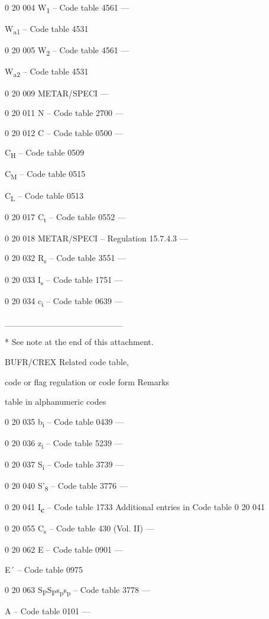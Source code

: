 0 20 004 W\textsubscript{1} -- Code table 4561 ---

W\textsubscript{a1} -- Code table 4531

0 20 005 W\textsubscript{2} -- Code table 4561 ---

W\textsubscript{a2} -- Code table 4531

0 20 009 METAR/SPECI ---

0 20 011 N -- Code table 2700 ---

0 20 012 C -- Code table 0500 ---

C\textsubscript{H} -- Code table 0509

C\textsubscript{M} -- Code table 0515

C\textsubscript{L} -- Code table 0513

0 20 017 C\textsubscript{t} -- Code table 0552 ---

0 20 018 METAR/SPECI -- Regulation 15.7.4.3 ---

0 20 032 R\textsubscript{s} -- Code table 3551 ---

0 20 033 I\textsubscript{s} -- Code table 1751 ---

0 20 034 c\textsubscript{i} -- Code table 0639 ---

\_\_\_\_\_\_\_\_\_\_\_\_\_\_\_\_\_\_\_

* See note at the end of this attachment.

BUFR/CREX Related code table,

code or flag regulation or code form Remarks

table in alphanumeric codes

0 20 035 b\textsubscript{i} -- Code table 0439 ---

0 20 036 z\textsubscript{i} -- Code table 5239 ---

0 20 037 S\textsubscript{i} -- Code table 3739 ---

0 20 040 S'\textsubscript{8} -- Code table 3776 ---

0 20 041 I\textbf{\textsubscript{c}} -- Code table 1733 Additional entries in Code table 0 20 041

0 20 055 C\textsubscript{s} -- Code table 430 (Vol. II) ---

0 20 062 E -- Code table 0901 ---

E´ -- Code table 0975

0 20 063 S\textsubscript{P}S\textsubscript{P}s\textsubscript{p}s\textsubscript{p} -- Code table 3778 ---

A -- Code table 0101 ---

